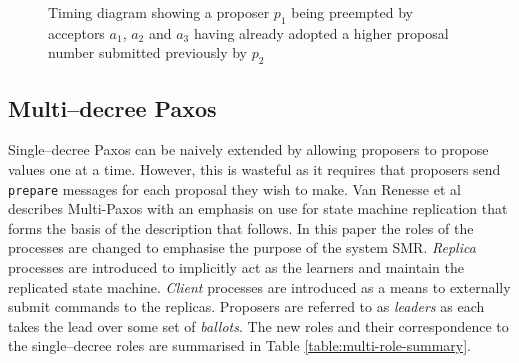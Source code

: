\begin{figure}
  \centering
  
  \caption{Timing diagram showing a proposer $p_1$ being preempted by acceptors $a_1$, $a_2$ and $a_3$ having already adopted a higher proposal number submitted previously by $p_2$}
  \label{fig:single-paxos-2}  
\end{figure}



\subsection{Multi--decree Paxos}
\label{subsection:multi-decree-paxos}

Single--decree Paxos can be naively extended by allowing proposers to propose values one at a time. However, this is wasteful as it requires that proposers send \texttt{prepare} messages for each proposal they wish to make. Van Renesse et al \cite{VanRenesse:2015:PMM:2737799.2673577} describes Multi-Paxos with an emphasis on use for state machine replication that forms the basis of the description that follows. In this paper the roles of the processes are changed to emphasise the purpose of the system SMR. \emph{Replica} processes are introduced to implicitly act as the learners and maintain the replicated state machine. \emph{Client} processes are introduced as a means to externally submit commands to the replicas. Proposers are referred to as \emph{leaders} as each takes the lead over some set of \emph{ballots}. The new roles and their correspondence to the single--decree roles are summarised in Table \ref{table:multi-role-summary}. \\

%  

